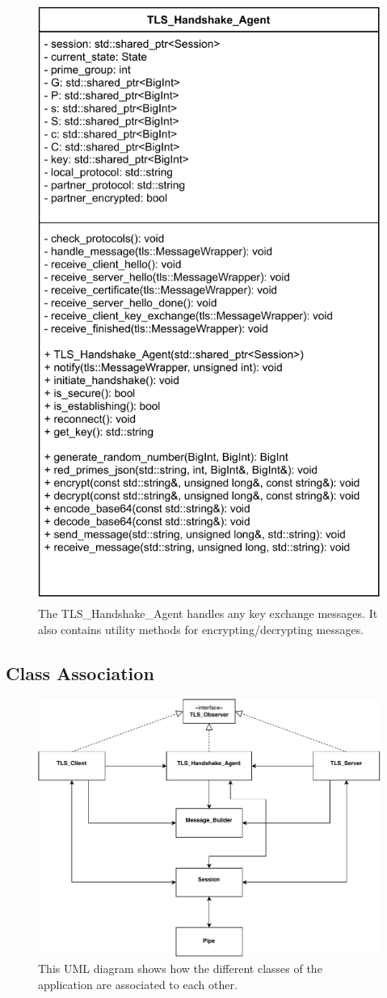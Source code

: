 \documentclass[12pt, letterpaper]{article}
\begin{document}
\begin{figure}[H]
	\centering
	\includegraphics[width=.7\textwidth]{UML/HandshakeAgent}
	\caption{The TLS\_Handshake\_Agent handles any key exchange messages. It also contains  utility methods for encrypting/decrypting messages.}
	\label{fig:HandshakeAgent}
\end{figure}

\subsection{Class Association}

\begin{figure}[H]
	\centering
	\includegraphics[width=.7\textwidth]{UML/ClassInteraction}
	\caption{This UML diagram shows how the different classes of the application are associated to each other.}
	\label{fig:ClassInteraction}
\end{figure}
\end{document}
